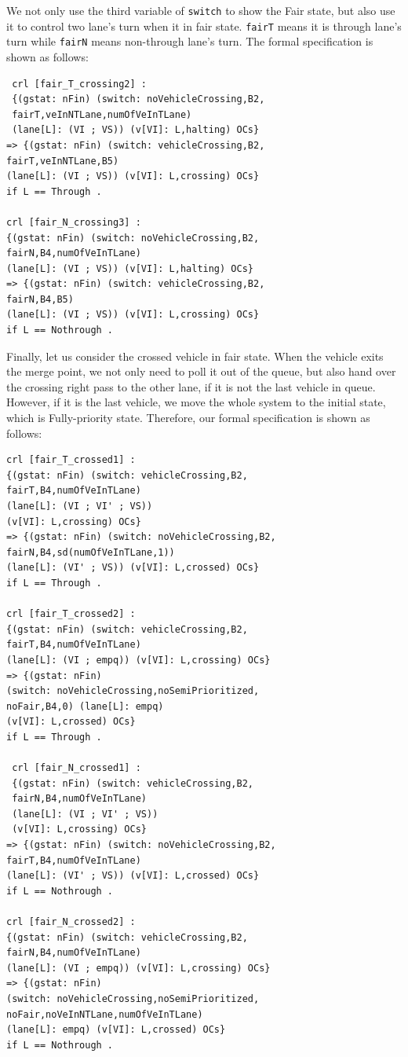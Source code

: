 \documentclass[10pt, conference, compsocconf]{IEEEtran}
\begin{document}
\noindent We not only use the third variable of \verb!switch! to show the Fair state, but also use it to control two lane's turn when it in fair state. 
\verb!fairT! means it is through lane's turn while \verb!fairN! means non-through lane's turn. 
The formal specification is shown as follows:

\begin{footnotesize}
\begin{verbatim}
 crl [fair_T_crossing2] : 
 {(gstat: nFin) (switch: noVehicleCrossing,B2,
 fairT,veInNTLane,numOfVeInTLane) 
 (lane[L]: (VI ; VS)) (v[VI]: L,halting) OCs} 
=> {(gstat: nFin) (switch: vehicleCrossing,B2,
fairT,veInNTLane,B5) 
(lane[L]: (VI ; VS)) (v[VI]: L,crossing) OCs} 
if L == Through .

crl [fair_N_crossing3] : 
{(gstat: nFin) (switch: noVehicleCrossing,B2,
fairN,B4,numOfVeInTLane) 
(lane[L]: (VI ; VS)) (v[VI]: L,halting) OCs} 
=> {(gstat: nFin) (switch: vehicleCrossing,B2,
fairN,B4,B5) 
(lane[L]: (VI ; VS)) (v[VI]: L,crossing) OCs} 
if L == Nothrough .
\end{verbatim}
\end{footnotesize}

\noindent Finally, let us consider the crossed vehicle in fair state. 
When the vehicle exits the merge point, we not only need to poll it out of the queue, but also hand over the crossing right pass to the other lane, if it is not the last vehicle in queue.
However, if it is the last vehicle, we move the whole system to the initial state, which is Fully-priority state.
Therefore, our formal specification is shown as follows:

\begin{footnotesize}
\begin{verbatim}
crl [fair_T_crossed1] : 
{(gstat: nFin) (switch: vehicleCrossing,B2,
fairT,B4,numOfVeInTLane) 
(lane[L]: (VI ; VI' ; VS))
(v[VI]: L,crossing) OCs} 
=> {(gstat: nFin) (switch: noVehicleCrossing,B2,
fairN,B4,sd(numOfVeInTLane,1)) 
(lane[L]: (VI' ; VS)) (v[VI]: L,crossed) OCs} 
if L == Through .

crl [fair_T_crossed2] :
{(gstat: nFin) (switch: vehicleCrossing,B2,
fairT,B4,numOfVeInTLane) 
(lane[L]: (VI ; empq)) (v[VI]: L,crossing) OCs} 
=> {(gstat: nFin) 
(switch: noVehicleCrossing,noSemiPrioritized,
noFair,B4,0) (lane[L]: empq) 
(v[VI]: L,crossed) OCs} 
if L == Through .

 crl [fair_N_crossed1] : 
 {(gstat: nFin) (switch: vehicleCrossing,B2,
 fairN,B4,numOfVeInTLane) 
 (lane[L]: (VI ; VI' ; VS)) 
 (v[VI]: L,crossing) OCs} 
=> {(gstat: nFin) (switch: noVehicleCrossing,B2,
fairT,B4,numOfVeInTLane) 
(lane[L]: (VI' ; VS)) (v[VI]: L,crossed) OCs} 
if L == Nothrough .

crl [fair_N_crossed2] :
{(gstat: nFin) (switch: vehicleCrossing,B2,
fairN,B4,numOfVeInTLane) 
(lane[L]: (VI ; empq)) (v[VI]: L,crossing) OCs} 
=> {(gstat: nFin) 
(switch: noVehicleCrossing,noSemiPrioritized,
noFair,noVeInNTLane,numOfVeInTLane) 
(lane[L]: empq) (v[VI]: L,crossed) OCs} 
if L == Nothrough .
\end{verbatim}
\end{footnotesize}
\end{document}
